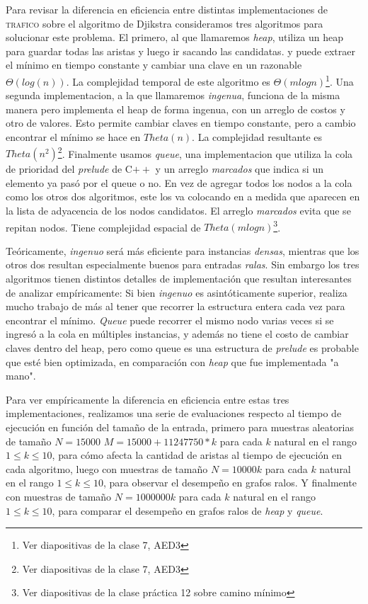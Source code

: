 Para revisar la diferencia en eficiencia entre distintas implementaciones de \textsc{trafico} sobre el algoritmo de Djikstra consideramos tres algoritmos para solucionar este problema. El primero, al que llamaremos \textit{heap}, utiliza un heap para guardar todas las aristas y luego ir sacando las candidatas. y puede extraer el mínimo en tiempo constante y cambiar una clave en un razonable $\Theta(log(n))$. La complejidad temporal de este algoritmo es $\Theta(mlogn)$\footnote{Ver diapositivas de la clase 7, AED3}. Una segunda implementacion, a la que llamaremos \textit{ingenua}, funciona de la misma manera pero implementa el heap de forma ingenua, con un arreglo de costos y otro de valores. Esto permite cambiar claves en tiempo constante, pero a cambio encontrar el mínimo se hace en $Theta(n)$. La complejidad resultante es $Theta(n^2)$\footnote{Ver diapositivas de la clase 7, AED3}. Finalmente usamos \textit{queue}, una implementacion que utiliza la cola de prioridad del \textit{prelude} de C$++$ y un arreglo \textit{marcados} que indica si un elemento ya pasó por el queue o no. En vez de agregar todos los nodos a la cola como los otros dos algoritmos, este los va colocando en a medida que aparecen en la lista de adyacencia de los nodos candidatos. El arreglo \textit{marcados} evita que se repitan nodos. Tiene complejidad espacial de $Theta(mlogn)$\footnote{Ver diapositivas de la clase práctica 12 sobre camino mínimo}.

Teóricamente, \textit{ingenuo} será más eficiente para instancias \textit{densas}, mientras que los otros dos resultan especialmente buenos para entradas \textit{ralas}. Sin embargo los tres algoritmos tienen distintos detalles de implementación que resultan interesantes de analizar empíricamente: Si bien \textit{ingenuo} es asintóticamente superior, realiza mucho trabajo de más al tener que recorrer la estructura entera cada vez para encontrar el mínimo. \textit{Queue} puede recorrer el mismo nodo varias veces si se ingresó a la cola en múltiples instancias, y además no tiene el costo de cambiar claves dentro del heap, pero como queue es una estructura de \textit{prelude} es probable que esté bien optimizada, en comparación con \textit{heap} que fue implementada "a mano".

Para ver empíricamente la diferencia en eficiencia entre estas tres implementaciones, realizamos una serie de evaluaciones respecto al tiempo de ejecución en función del tamaño de la entrada, primero para muestras aleatorias de tamaño $N = 15000$ $M = 15000 + 11247750 * k$ para cada $k$ natural  en el rango $1 \leq k \leq 10$, para cómo afecta la cantidad de aristas al tiempo de ejecución en cada algoritmo, luego con muestras de tamaño $N = 10000k$ para cada $k$ natural en el rango $1 \leq k \leq 10$, para observar el desempeño en grafos ralos. Y finalmente con muestras de tamaño $N = 1000000k$ para cada $k$ natural en el rango $1 \leq k \leq 10$, para comparar el desempeño en grafos ralos de \textit{heap} y \textit{queue}.

